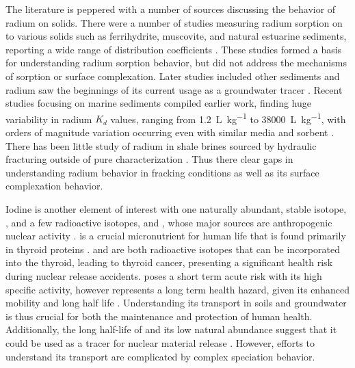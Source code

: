 \documentclass[twoside,12pt,titlepage]{article}
\newcommand{\isotope}[2]{\ch{^{#1}#2}}
\begin{document}
\par The literature is peppered with a number of sources discussing the behavior of radium on solids. There were a number of studies measuring radium sorption on to various solids such as ferrihydrite, muscovite, and natural estuarine sediments, reporting a wide range of distribution coefficients \cite{Ames1983a,Ames1983b,Benes1984}. These studies formed a basis for understanding radium sorption behavior, but did not address the mechanisms of sorption or surface complexation. Later studies included other sediments \cite{Tachi2001} and radium saw the beginnings of its current usage as a groundwater tracer \cite{Moore1996}. Recent studies focusing on marine sediments compiled earlier work, finding huge variability in radium $K_d$ values, ranging from \SI{1.2}{\liter\per\kilo\gram} to \SI{38000}{\liter\per\kilo\gram}, with orders of magnitude variation occurring even with similar media and sorbent \cite{Beck2013}. There has been little study of radium in shale brines sourced by hydraulic fracturing outside of pure characterization \cite{Barbot2013,Rowan2011}. Thus there clear gaps in understanding radium behavior in fracking conditions as well as its surface complexation behavior.
\par Iodine is another element of interest with one naturally abundant, stable isotope, \isotope{127}{I}, and a few radioactive isotopes, \isotope{129}{I} and \isotope{131}{I}, whose major sources are anthropogenic nuclear activity \cite{He2013,Landis2012}. \isotope{127}{I} is a crucial micronutrient for human life that is found primarily in thyroid proteins \cite{Hu2009}. \isotope{129}{I} and \isotope{131}{I} are both radioactive isotopes that can be incorporated into the thyroid, leading to thyroid cancer, presenting a significant health risk during nuclear release accidents. \isotope{131}{I} poses a short term acute risk with its high specific activity, however \isotope{129}{I} represents a long term health hazard, given its enhanced mobility and long half life \cite{Emerson2014}. Understanding its transport in soils and groundwater is thus crucial for both the maintenance and protection of human health. Additionally, the long half-life of \isotope{129}{I} and its low natural abundance suggest that it could be used as a tracer for nuclear material release \cite{He2013}. However, efforts to understand its transport are complicated by complex speciation behavior.
\end{document}
